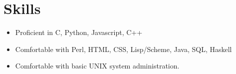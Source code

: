 \documentclass[letterpaper,10pt]{article}
\begin{document}
\section*{Skills}
\vspace*{-0.2cm}
\begin{itemize}
\item Proficient in C, Python, Javascript, C++
\item Comfortable with Perl, HTML, CSS, Lisp/Scheme, Java, SQL, Haskell
\item Comfortable with basic UNIX system administration.

\end{itemize}

\end{document}
